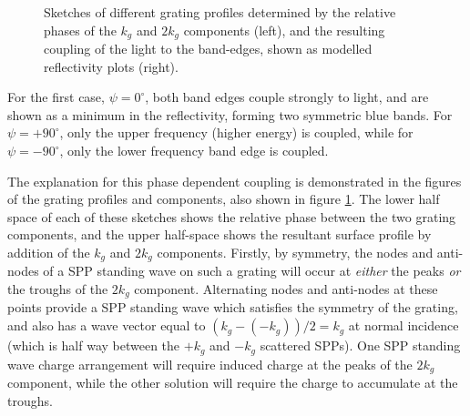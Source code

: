 \begin{figure}
\begin{center}
\end{center}
\caption[Sketches of different grating profiles determined by the relative phases of the $k_g$ and $2k_g$ components, and the resulting coupling of the light to the band-edges.]{Sketches of different grating profiles determined by the relative phases of the $k_g$ and $2k_g$ components (left), and the resulting coupling of the light to the band-edges, shown as modelled reflectivity plots (right). \label{fig:couplingbandedges}}
\end{figure}
For the first case, $\psi=0^\circ$, both band edges couple strongly to light, and are shown as a minimum in the reflectivity, forming two symmetric blue bands. For $\psi=+90^\circ$, only the upper frequency (higher energy) is coupled, while for $\psi=-90^\circ$, only the lower frequency band edge is coupled. 

The explanation for this phase dependent coupling is demonstrated in the figures of the grating profiles and components, also shown in figure \ref{fig:couplingbandedges}. The lower half space of each of these sketches shows the relative phase between the two grating components, and the upper half-space shows the resultant surface profile by addition of the $k_g$ and $2k_g$ components.
Firstly, by symmetry, the nodes and anti-nodes of a SPP standing wave on such a grating will occur at \textit{either} the peaks \textit{or} the troughs of the $2k_g$ component. Alternating nodes and anti-nodes at these points provide a SPP standing wave which satisfies the symmetry of the grating, and also has a wave vector equal to $(k_g-(-k_g))/2=k_g$ at normal incidence (which is half way between the $+k_g$ and $-k_g$ scattered SPPs). One SPP standing wave charge arrangement will require induced charge at the peaks of the $2k_g$ component, while the other solution will require the charge to accumulate at the troughs.


